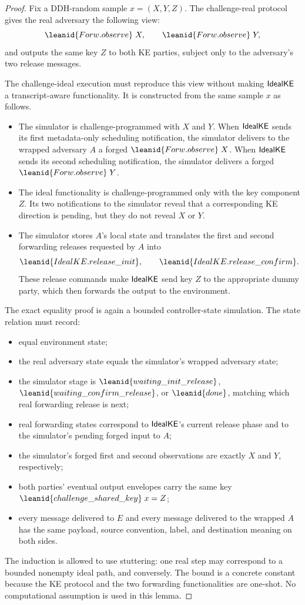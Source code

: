 \begin{proof}
Fix a DDH-random sample \(x=(X,Y,Z)\).  The challenge-real protocol gives the
real adversary the following view:
\[
  \leanid{Forw.observe}\;X,\qquad
  \leanid{Forw.observe}\;Y,
\]
and outputs the same key \(Z\) to both KE parties, subject only to the
adversary's two release messages.

The challenge-ideal execution must reproduce this view without making
\(\mathsf{IdealKE}\) a transcript-aware functionality.  It is constructed from the
same sample \(x\) as follows.
\begin{itemize}
\item The simulator is challenge-programmed with \(X\) and \(Y\).  When
\(\mathsf{IdealKE}\) sends its first metadata-only scheduling notification, the
simulator delivers to the wrapped adversary \(A\) a forged
\(\leanid{Forw.observe}\;X\).  When \(\mathsf{IdealKE}\) sends its second scheduling
notification, the simulator delivers a forged \(\leanid{Forw.observe}\;Y\).
\item The ideal functionality is challenge-programmed only with the key
component \(Z\).  Its two notifications to the simulator reveal that a
corresponding KE direction is pending, but they do not reveal \(X\) or \(Y\).
\item The simulator stores \(A\)'s local state and translates the first and
second forwarding releases requested by \(A\) into
\[
  \leanid{IdealKE.release\_init},\qquad
  \leanid{IdealKE.release\_confirm}.
\]
These release commands make \(\mathsf{IdealKE}\) send key \(Z\) to the appropriate
dummy party, which then forwards the output to the environment.
\end{itemize}

The exact equality proof is again a bounded controller-state simulation.  The
state relation must record:
\begin{itemize}
\item equal environment state;
\item the real adversary state equals the simulator's wrapped adversary state;
\item the simulator stage is
\(\leanid{waiting\_init\_release}\),
\(\leanid{waiting\_confirm\_release}\), or \(\leanid{done}\), matching which
real forwarding release is next;
\item real forwarding states correspond to \(\mathsf{IdealKE}\)'s current release phase
and to the simulator's pending forged input to \(A\);
\item the simulator's forged first and second observations are exactly
\(X\) and \(Y\), respectively;
\item both parties' eventual output envelopes carry the same key
\(\leanid{challenge\_shared\_key}\;x=Z\);
\item every message delivered to \(E\) and every message delivered to the
wrapped \(A\) has the same payload, source convention, label, and destination
meaning on both sides.
\end{itemize}
The induction is allowed to use stuttering: one real step may correspond to a
bounded nonempty ideal path, and conversely.  The bound is a concrete constant
because the KE protocol and the two forwarding functionalities are one-shot.
No computational assumption is used in this lemma.


\end{proof}
